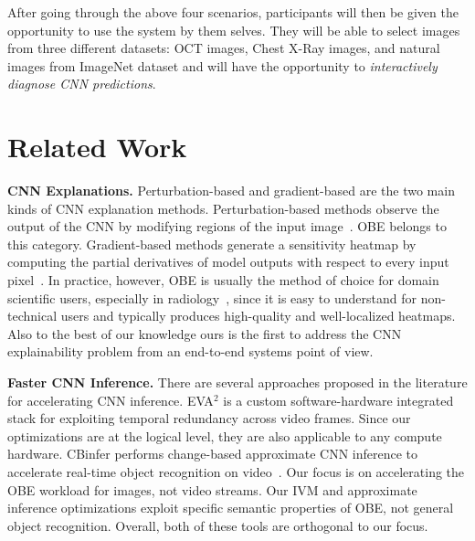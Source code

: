 \documentclass{vldb}
\begin{document}
\vspace{2mm}
After going through the above four scenarios, participants will then be given the opportunity to use the system by them selves.
They will be able to select images from three different datasets: OCT images, Chest X-Ray images, and natural images from ImageNet dataset and will have the opportunity to \textit{interactively diagnose CNN predictions}.


\section{Related Work}

\noindent \textbf{CNN Explanations.} Perturbation-based and gradient-based are the two main kinds of CNN explanation methods. Perturbation-based methods observe the output of the CNN by modifying regions of the input image~\cite{zeiler2014visualizing}. OBE belongs to this category.
Gradient-based methods generate a sensitivity heatmap by computing the partial derivatives of model outputs with respect to every input pixel~\cite{simonyan2013deep}.
In practice, however, OBE is usually the method of choice for domain scientific users, especially in radiology~\cite{jung2017deep,miller2017explanation}, since it is easy to understand for non-technical users and typically produces high-quality and well-localized heatmaps.
Also to the best of our knowledge ours is the first to address the CNN explainability problem from an end-to-end systems point of view.

\vspace{2mm}
\noindent \textbf{Faster CNN Inference.} There are several approaches proposed in the literature for accelerating CNN inference.
EVA$^2$ \cite{buckler2018eva} is a custom software-hardware integrated stack for exploiting temporal redundancy across video frames. Since our optimizations are at the logical level, they are also applicable to any compute hardware.
CBinfer performs change-based approximate CNN inference to accelerate real-time object recognition on video~\cite{cavigelli2017cbinfer}. Our focus is on accelerating the OBE workload for images, not video streams. Our IVM and approximate inference optimizations exploit specific semantic properties of OBE, not general object recognition. Overall, both of these tools are orthogonal to our focus.


\balance



\end{document}
